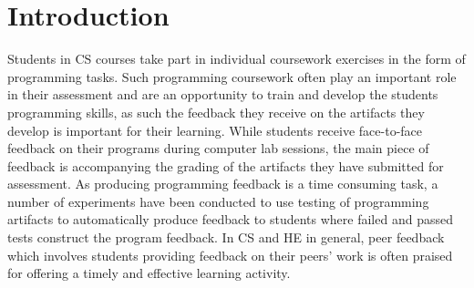 \documentclass[sigplan,10pt,review]{acmart}\settopmatter{printfolios=true}
\begin{document}




\maketitle


\section{Introduction}
\label{sec:introduction}

Students in \ac{CS} courses take part in individual coursework
exercises in the form of programming tasks. Such programming
coursework often play an important role in their assessment and are an
opportunity to train and develop the students programming skills, as
such the feedback they receive on the artifacts they develop is
important for their learning. While students receive face-to-face
feedback on their programs during computer lab sessions, the main
piece of feedback is accompanying the grading of the artifacts they
have submitted for assessment. As producing programming feedback is a
time consuming task, a number of experiments have been conducted to
use testing of programming artifacts to automatically produce feedback
to students where failed and passed tests construct the program
feedback. In \ac{CS} and \ac{HE} in general, peer feedback which
involves students providing feedback on their peers' work is often
praised for offering a timely and effective learning activity.
\end{document}
